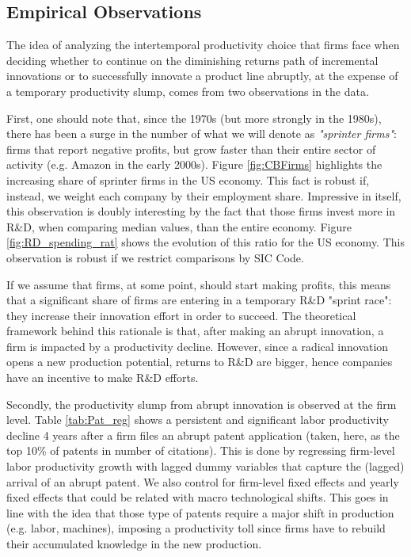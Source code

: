\documentclass[letterpaper,12pt]{article}
\theoremstyle{definition}
\begin{document}
\subsection{Empirical Observations}

The idea of analyzing the intertemporal productivity choice that firms face when deciding whether to continue on the diminishing returns path of incremental innovations or to successfully innovate a product line abruptly, at the expense of a temporary productivity slump, comes from two observations in the data.

First, one should note that, since the 1970s (but more strongly in the 1980s), there has been a surge in the number of what we will denote as \textit{"sprinter firms"}: firms that report negative profits, but grow faster than their entire sector of activity (e.g. Amazon in the early 2000s). Figure \ref{fig:CBFirms} highlights the increasing share of sprinter firms in the US economy. This fact is robust if, instead, we weight each company by their employment share. Impressive in itself, this observation is doubly interesting by the fact that those firms invest more in R\&D, when comparing median values, than the entire economy. Figure \ref{fig:RD_spending_rat} shows the evolution of this ratio for the US economy. This observation is robust if we restrict comparisons by SIC Code.

If we assume that firms, at some point, should start making profits, this means that a significant share of firms are entering in a temporary R\&D "sprint race": they increase their innovation effort in order to succeed. The theoretical framework behind this rationale is that, after making an abrupt innovation, a firm is impacted by a productivity decline. However, since a radical innovation opens a new production potential, returns to R\&D are bigger, hence companies have an incentive to make R\&D efforts.

Secondly, the productivity slump from abrupt innovation is observed at the firm level. Table \ref{tab:Pat_reg} shows a persistent and significant labor productivity decline 4 years after a firm files an abrupt patent application (taken, here, as the top 10\% of patents in number of citations). This is done by regressing firm-level labor productivity growth with lagged dummy variables that capture the (lagged) arrival of an abrupt patent. We also control for firm-level fixed effects and yearly fixed effects that could be related with macro technological shifts. This goes in line with the idea that those type of patents require a major shift in production (e.g. labor, machines), imposing a productivity toll since firms have to rebuild their accumulated knowledge in the new production.
\end{document}
